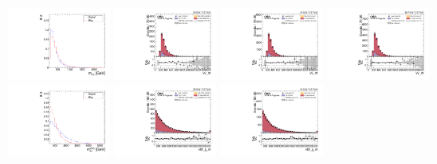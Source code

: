 \begin{figure}[!ht]
  \centering
  \includegraphics[width=0.24\textwidth]{analysis_plots/tmva_plots/zjj_BDTG14_dibos_m.pdf}
  \includegraphics[width=0.24\textwidth]{analysis_plots/2016_zjj/cr_vjets_l/vv_m.pdf}
  \includegraphics[width=0.24\textwidth]{analysis_plots/2017_zjj/cr_vjets_l/vv_m.pdf}
  \includegraphics[width=0.24\textwidth]{analysis_plots/2018_zjj/cr_vjets_l/vv_m.pdf} \\
  \includegraphics[width=0.24\textwidth]{analysis_plots/tmva_plots/zjj_BDTG14_vbf_m.pdf}
  \includegraphics[width=0.24\textwidth]{analysis_plots/2016_zjj/cr_vjets_l/vbf_jj_m.pdf}
  \includegraphics[width=0.24\textwidth]{analysis_plots/2017_zjj/cr_vjets_l/vbf_jj_m.pdf}

\end{figure}
